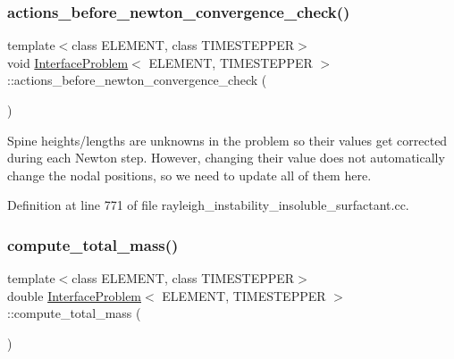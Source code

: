 \subsubsection{\texorpdfstring{actions\+\_\+before\+\_\+newton\+\_\+convergence\+\_\+check()}{actions\_before\_newton\_convergence\_check()}\hspace{0.1cm}{\footnotesize\ttfamily [2/2]}}
{\footnotesize\ttfamily template$<$class E\+L\+E\+M\+E\+NT, class T\+I\+M\+E\+S\+T\+E\+P\+P\+ER$>$ \\
void \hyperlink{classInterfaceProblem}{Interface\+Problem}$<$ E\+L\+E\+M\+E\+NT, T\+I\+M\+E\+S\+T\+E\+P\+P\+ER $>$\+::actions\+\_\+before\+\_\+newton\+\_\+convergence\+\_\+check (\begin{DoxyParamCaption}{ }\end{DoxyParamCaption})\hspace{0.3cm}{\ttfamily [inline]}}

Spine heights/lengths are unknowns in the problem so their values get corrected during each Newton step. However, changing their value does not automatically change the nodal positions, so we need to update all of them here. 

Definition at line 771 of file rayleigh\+\_\+instability\+\_\+insoluble\+\_\+surfactant.\+cc.

\mbox{\label{classInterfaceProblem_a9b19bc90667fe8c7885d8ee113812e27}} 
\subsubsection{\texorpdfstring{compute\+\_\+total\+\_\+mass()}{compute\_total\_mass()}\hspace{0.1cm}{\footnotesize\ttfamily [1/3]}}
{\footnotesize\ttfamily template$<$class E\+L\+E\+M\+E\+NT, class T\+I\+M\+E\+S\+T\+E\+P\+P\+ER$>$ \\
double \hyperlink{classInterfaceProblem}{Interface\+Problem}$<$ E\+L\+E\+M\+E\+NT, T\+I\+M\+E\+S\+T\+E\+P\+P\+ER $>$\+::compute\+\_\+total\+\_\+mass (\begin{DoxyParamCaption}{ }\end{DoxyParamCaption})\hspace{0.3cm}{\ttfamily [inline]}}



